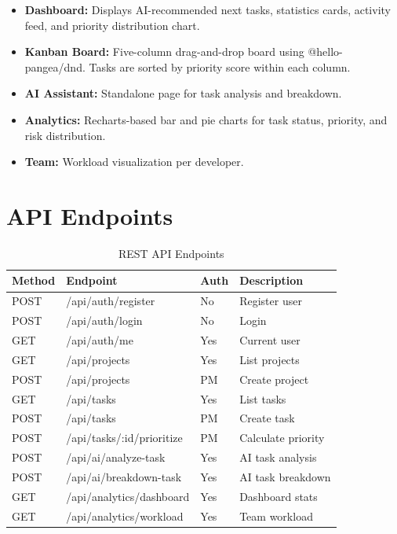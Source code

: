\documentclass[12pt,a4paper,oneside]{report}
\begin{document}
\begin{itemize}[noitemsep]
  \item \textbf{Dashboard:} Displays AI-recommended next tasks, statistics cards, activity feed, and priority distribution chart.
  \item \textbf{Kanban Board:} Five-column drag-and-drop board using @hello-pangea/dnd. Tasks are sorted by priority score within each column.
  \item \textbf{AI Assistant:} Standalone page for task analysis and breakdown.
  \item \textbf{Analytics:} Recharts-based bar and pie charts for task status, priority, and risk distribution.
  \item \textbf{Team:} Workload visualization per developer.
\end{itemize}

\section{API Endpoints}

\begin{table}[H]
\centering
\caption{REST API Endpoints}
\label{tab:api}
\begin{tabular}{|l|l|l|p{4.5cm}|}
\hline
\textbf{Method} & \textbf{Endpoint} & \textbf{Auth} & \textbf{Description} \\
\hline
POST & /api/auth/register & No & Register user \\
POST & /api/auth/login & No & Login \\
GET  & /api/auth/me & Yes & Current user \\
GET  & /api/projects & Yes & List projects \\
POST & /api/projects & PM & Create project \\
GET  & /api/tasks & Yes & List tasks \\
POST & /api/tasks & PM & Create task \\
POST & /api/tasks/:id/prioritize & PM & Calculate priority \\
POST & /api/ai/analyze-task & Yes & AI task analysis \\
POST & /api/ai/breakdown-task & Yes & AI task breakdown \\
GET  & /api/analytics/dashboard & Yes & Dashboard stats \\
GET  & /api/analytics/workload & Yes & Team workload \\
\hline
\end{tabular}
\end{table}
\end{document}
